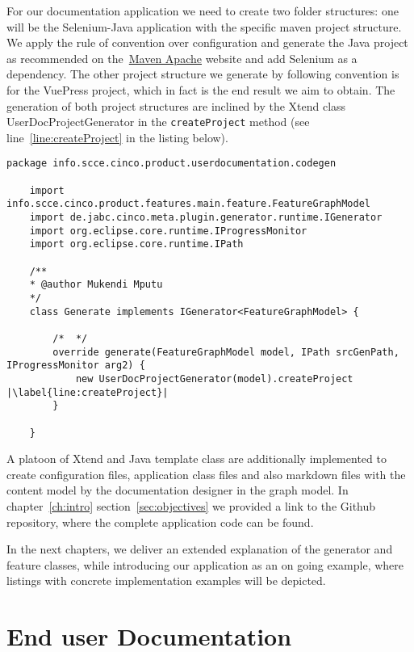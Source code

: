 For our documentation application we need to create two folder structures: one will be the Selenium-Java application with the specific maven project structure. We apply the rule of convention over configuration and generate the Java project as recommended on the~\href{https://www.apache.org/}{Maven Apache} website and add Selenium as a dependency. The other project structure we generate by following convention is for the VuePress project, which in fact is the end result we aim to obtain. The generation of both project structures are inclined by the Xtend class UserDocProjectGenerator in the \lstinline[language=MGL]{createProject} method (see line~\ref{line:createProject} in the listing below).

\begin{lstlisting}[language=MGL, caption={Generate.xtend clas implementing the IGenerator infterface}, label=generateClass, escapechar=|]
    package info.scce.cinco.product.userdocumentation.codegen

    import info.scce.cinco.product.features.main.feature.FeatureGraphModel
    import de.jabc.cinco.meta.plugin.generator.runtime.IGenerator
    import org.eclipse.core.runtime.IProgressMonitor
    import org.eclipse.core.runtime.IPath

    /**
    * @author Mukendi Mputu
    */
    class Generate implements IGenerator<FeatureGraphModel> {

        /*	*/
        override generate(FeatureGraphModel model, IPath srcGenPath, IProgressMonitor arg2) {
            new UserDocProjectGenerator(model).createProject |\label{line:createProject}|
        }
        
    }
\end{lstlisting}

A platoon of Xtend and Java template class are additionally implemented to create configuration files, application class files and also markdown files with the content model by the documentation designer in the graph model. In chapter~\ref{ch:intro} section~\ref{sec:objectives} we provided a link to the Github repository, where the complete application code can be found.

In the next chapters, we deliver an extended explanation of the generator and feature classes, while introducing our application as an on going example, where listings with concrete implementation examples will be depicted.

\section{End user Documentation}\label{sec:endUserDoc}

